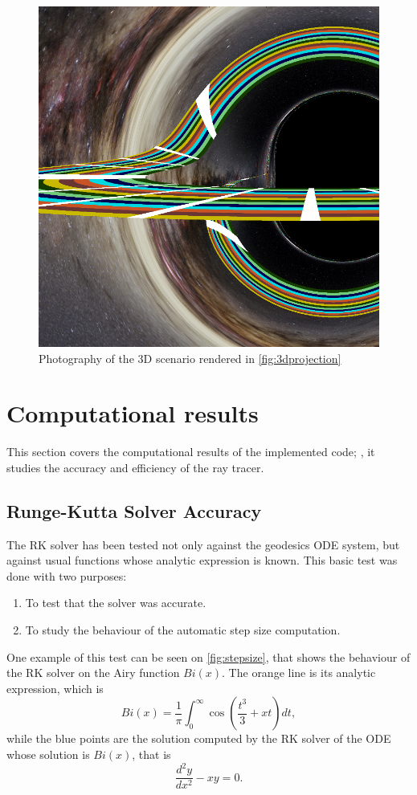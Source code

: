 \begin{figure}[bth]
	\myfloatalign
	\includegraphics[width=.7\linewidth]{gfx/3d_01_image}
	\caption[Photography of the 3D scenario rendered in \autoref{fig:3dprojection}]{Photography of the 3D scenario rendered in \autoref{fig:3dprojection}}
	\label{fig:3dprojectionimage}
\end{figure}

\section{Computational results}

This section covers the computational results of the implemented code; \ie, it studies the accuracy and efficiency of the ray tracer.

\subsection{Runge-Kutta Solver Accuracy}

The \ac{RK} solver has been tested not only against the geodesics \ac{ODE} system, but against usual functions whose analytic expression is known. This basic test was done with two purposes:
\begin{enumerate}
	\item To test that the solver was accurate.
	\item To study the behaviour of the automatic step size computation.
\end{enumerate}

One example of this test can be seen on \autoref{fig:stepsize}, that shows the behaviour of the \ac{RK} solver on the Airy function $Bi(x)$. The orange line is its analytic expression, which is
\[
	Bi(x) = \frac{1}{\pi} \int_0^\infty \cos\left(\frac{t^3}{3} + xt\right)dt,
\]
while the blue points are the solution computed by the \ac{RK} solver of the \ac{ODE} whose solution is $Bi(x)$, that is
\[
	\frac{d^2y}{dx^2} - xy = 0.
\]

